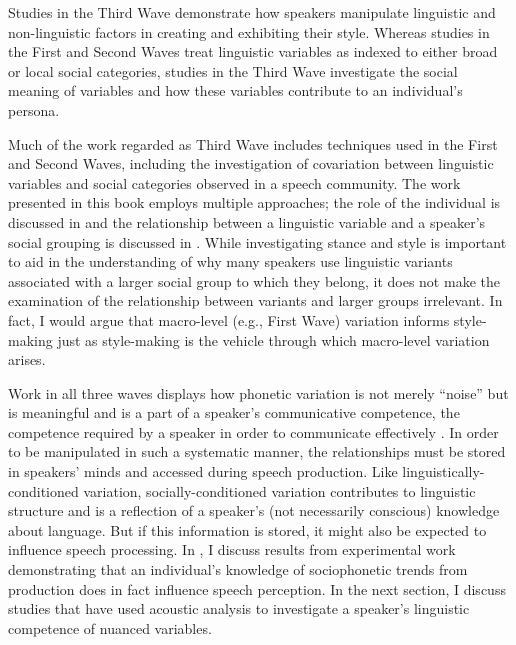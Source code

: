 Studies in the Third Wave demonstrate how speakers manipulate linguistic and non-linguistic factors in creating and exhibiting their style. Whereas studies in the First and Second Waves treat linguistic variables as indexed to either broad or local social categories, studies in the Third Wave investigate the social meaning of variables and how these variables contribute to an individual's persona. 

Much of the work regarded as Third Wave includes techniques used in the First and Second Waves, including the investigation of covariation between linguistic variables and social categories observed in a speech community. The work presented in this book employs multiple approaches; the role of the individual is discussed in  and the relationship between a linguistic variable and a speaker's social grouping is discussed in . While investigating stance and style is important to aid in the understanding of why many speakers use linguistic variants associated with a larger social group to which they belong, it does not make the examination of the relationship between variants and larger groups irrelevant. In fact, I would argue that macro-level (e.g., First Wave) variation informs style-making just as style-making is the vehicle through which macro-level variation arises.


  


Work in all three waves displays how phonetic variation is not merely ``noise'' but is meaningful and is a part of a speaker's communicative competence, the competence required by a speaker in order to communicate effectively \citep{hymes1972}. In order to be manipulated in such a systematic manner, the relationships must be stored in speakers' minds and accessed during speech production. Like linguistically-conditioned variation, socially-conditioned variation contributes to linguistic structure and is a reflection of a speaker's (not necessarily conscious) knowledge about language. But if this information is stored, it might also be expected to influence speech processing. In , I discuss results from experimental work demonstrating that an individual's knowledge of sociophonetic trends from production does in fact influence speech perception. In the next section, I discuss studies that have used acoustic analysis to investigate a speaker's linguistic competence of nuanced variables.


